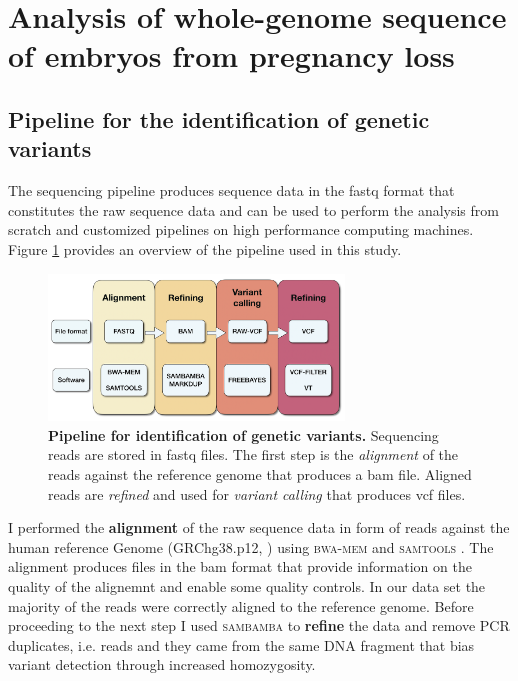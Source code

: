 
\section{Analysis of whole-genome sequence of embryos from pregnancy loss}
\subsection{Pipeline for the identification of genetic variants}
The sequencing pipeline produces sequence data in the \gls{fastq} format that constitutes the raw sequence data and can be used to perform the analysis from scratch and customized pipelines on \gls{high performance computing} machines. Figure \ref{fig:align-ref-vc} provides an overview of the pipeline used in this study.\newline

\vspace{1cm}

\begin{figure}[H]
\centering
\includegraphics[width=0.7\textwidth]{fig/align-ref-vc.png}
\decoRule
\caption{\textbf{Pipeline for identification of genetic variants.} Sequencing reads are stored in fastq files. The first step is the \textit{alignment} of the reads against the reference genome that produces a bam file. Aligned reads are \textit{refined} and used for \textit{variant calling} that produces vcf files.}
\label{fig:align-ref-vc}
\end{figure}

\vspace{0.5cm}

I performed the \textbf{alignment} of the raw sequence data in form of \gls{reads} against the human reference Genome (GRChg38.p12, \cite{rosenbloom2015ucsc}) using \textsc{bwa-mem} \cite{li2013aligning} and \textsc{samtools} \cite{li2009sequence}. The alignment produces files in the \gls{bam} format that provide information on the quality of the alignemnt and enable some quality controls. In our data set the majority of the reads were correctly aligned to the reference genome.  \newline
Before proceeding to the next step I used \textsc{sambamba} \cite{tarasov2015sambamba} to \textbf{refine} the data and remove PCR duplicates, i.e. reads and they came from the same DNA fragment that bias variant detection through increased homozygosity.\newline

